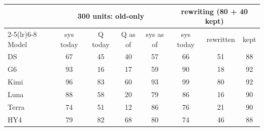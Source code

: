\begin{tabular}{@{}l cccc ccc@{}}
\toprule
 & \multicolumn{4}{c}{300 units: old-only} & \multicolumn{3}{c}{rewriting (80 + 40 kept)} \\
\cmidrule(lr){2-5}\cmidrule(lr){6-8}
Model & sys today & Q today & Q as of & sys as of & sys today & rewritten & kept \\
\midrule
DS & 67 & 45 & 40 & 57 & 66 & 51 & 88 \\
G6 & 93 & 16 & 17 & 59 & 90 & 18 & 92 \\
Kimi & 96 & 83 & 60 & 93 & 99 & 80 & 92 \\
Luna & 88 & 58 & 20 & 79 & 86 & 16 & 90 \\
Terra & 74 & 51 & 12 & 86 & 76 & 21 & 90 \\
HY4 & 79 & 82 & 68 & 80 & 74 & 46 & 88 \\
\bottomrule
\end{tabular}
